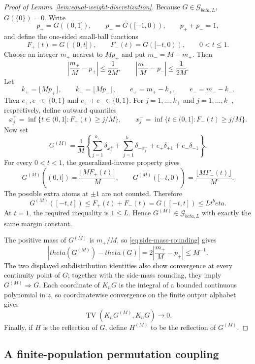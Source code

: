 \documentclass[11pt]{article}
\def\beta{beta}%
\def\theta{theta}%
\newcommand{\TV}{\operatorname{TV}}
\newcommand{\calG}{\mathcal G}
\begin{document}
\begin{proof}[Proof of Lemma~\ref{lem:equal-weight-discretization}]
Because $G\in\calG_{\beta,L}$, $G(\{0\})=0$.  Write
\[
p_+=G((0,1]),
\qquad
p_-=G([-1,0)),
\qquad
p_++p_-=1,
\]
and define the one-sided small-ball functions
\[
F_+(t)=G((0,t]),
\qquad
F_-(t)=G([-t,0)),
\qquad 0<t\le1.
\]
Choose an integer $m_+$ nearest to $Mp_+$ and put $m_-=M-m_+$.  Then
\begin{equation}
\label{eq:side-mass-rounding}
\left|\frac{m_+}{M}-p_+\right|\le\frac1{2M},
\qquad
\left|\frac{m_-}{M}-p_-\right|\le\frac1{2M}.
\end{equation}
Let
\[
k_+=\lfloor Mp_+\rfloor,
\qquad
k_-=\lfloor Mp_-\rfloor,
\qquad
e_+=m_+-k_+,
\qquad
e_-=m_--k_-.
\]
Then $e_+,e_-\in\{0,1\}$ and $e_++e_-\in\{0,1\}$.  For $j=1,\dots,k_+$ and $j=1,\dots,k_-$, respectively, define outward quantiles
\[
x_j^+
=
\inf\{t\in(0,1]:F_+(t)\ge j/M\},
\qquad
x_j^-
=
\inf\{t\in(0,1]:F_-(t)\ge j/M\}.
\]
Now set
\begin{equation}
\label{eq:outward-quantile-measure}
G^{(M)}
=
\frac1M
\left
\{
\sum_{j=1}^{k_+}\delta_{x_j^+}
+
\sum_{j=1}^{k_-}\delta_{-x_j^-}
+
e_+\delta_{+1}
+
e_-\delta_{-1}
\right\}.
\end{equation}
For every $0<t<1$, the generalized-inverse property gives
\[
G^{(M)}((0,t])
=
\frac{\lfloor MF_+(t)\rfloor}{M},
\qquad
G^{(M)}([-t,0))
=
\frac{\lfloor MF_-(t)\rfloor}{M}.
\]
The possible extra atoms at $\pm1$ are not counted.  Therefore
\[
G^{(M)}([-t,t])
\le
F_+(t)+F_-(t)
=
G([-t,t])
\le
Lt^\beta.
\]
At $t=1$, the required inequality is $1\le L$.  Hence $G^{(M)}\in\calG_{\beta,L}$ with exactly the same margin constant.

The positive mass of $G^{(M)}$ is $m_+/M$, so \eqref{eq:side-mass-rounding} gives
\[
|\theta(G^{(M)})-\theta(G)|
=
2\left|\frac{m_+}{M}-p_+\right|
\le M^{-1}.
\]
The two displayed subdistribution identities also show convergence at every continuity point of $G$; together with the side-mass rounding, they imply $G^{(M)}\Rightarrow G$.  Each coordinate of $K_nG$ is the integral of a bounded continuous polynomial in $z$, so coordinatewise convergence on the finite output alphabet gives
\[
\TV(K_nG^{(M)},K_nG)\to0.
\]
Finally, if $H$ is the reflection of $G$, define $H^{(M)}$ to be the reflection of $G^{(M)}$.
\end{proof}

\subsection{A finite-population permutation coupling}
\end{document}
